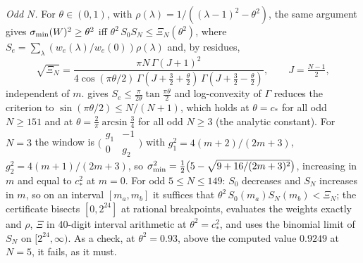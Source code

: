 \emph{Odd $N$.} For $\theta\in(0,1)$, with $\rho(\lambda)=1/((\lambda-1)^2-\theta^2)$,
the same argument gives $\sigma_{\min}(W)^2\ge \theta^2$ iff $\theta^2\,S_0S_N\le\Xi_N(\theta^2)$, where
$S_e=\sum_\lambda(w_e(\lambda)/w_e(0))\rho(\lambda)$ and, by residues,
\[
  \sqrt{\Xi_N}=\frac{\pi N\,\Gamma(J+1)^2}{4\cos(\pi \theta/2)\,\Gamma(J+\frac32+\frac \theta2)\,\Gamma(J+\frac32-\frac \theta2)},\qquad J=\tfrac{N-1}2,
\]
independent of $m$.  gives $S_e\le\frac{\pi}{2\theta}\tan\frac{\pi \theta}2$ and
log-convexity of $\Gamma$ reduces the criterion to $\sin(\pi \theta/2)\le N/(N+1)$, which holds at
$\theta=c_*$ for all odd $N\ge151$ and at $\theta=\frac2\pi\arcsin\frac34$ for all odd $N\ge3$ (the
analytic constant). For $N=3$ the window is $\bigl(\begin{smallmatrix}g_1&-1\\0&g_2\end{smallmatrix}\bigr)$
with $g_1^2=4(m+2)/(2m+3)$, $g_2^2=4(m+1)/(2m+3)$, so
$\sigma_{\min}^2=\frac12\bigl(5-\sqrt{9+16/(2m+3)^2}\bigr)$, increasing in $m$ and equal to $c_*^2$ at
$m=0$. For odd $5\le N\le149$: $S_0$ decreases and $S_N$ increases in $m$, so on an interval
$[m_a,m_b]$ it suffices that $\theta^2\,S_0(m_a)S_N(m_b)<\Xi_N$; the certificate bisects $[0,2^{24}]$
at rational breakpoints, evaluates the weights exactly and $\rho$, $\Xi$ in 40-digit interval
arithmetic at $\theta^2=c_*^2$, and uses the binomial limit of $S_N$ on $[2^{24},\infty)$.
As a check, at $\theta^2=0.93$, above the computed value $0.9249$ at $N=5$, it fails, as it must.
